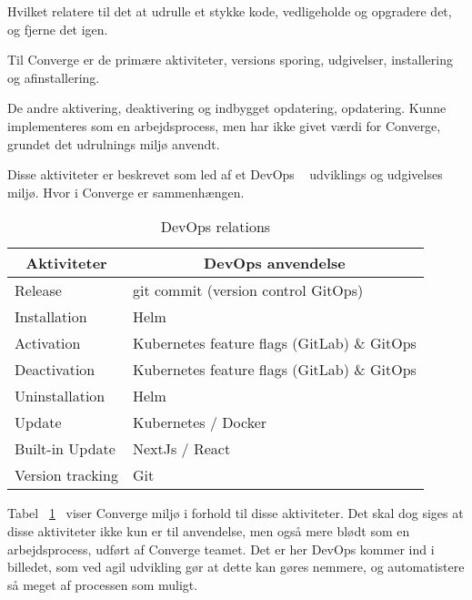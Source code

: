 Hvilket relatere til det at udrulle et stykke kode, vedligeholde og opgradere det, og fjerne det igen.

Til Converge er de primære aktiviteter, versions sporing, udgivelser, installering og afinstallering.

De andre aktivering, deaktivering og indbygget opdatering, opdatering. Kunne implementeres som en arbejdsprocess, men har ikke givet værdi for Converge, grundet det udrulnings miljø anvendt.

Disse aktiviteter er beskrevet som led af et DevOps ~\cite{documentation_terms} udviklings og udgivelses miljø. Hvor i Converge er sammenhængen.

\begin{table}[H]
    \begin{small}
        \caption{DevOps relations}
        \label{tab:devops-relation}
        \begin{center}
            \begin{tabular}[c]{l|l}
                \multicolumn{1}{c|}{\textbf{Aktiviteter}} & 
                \multicolumn{1}{c}{\textbf{DevOps anvendelse}} \\
                \hline
                Release & git commit (version control GitOps) \\
                Installation & Helm \\
                Activation & Kubernetes feature flags  (GitLab) \& GitOps \\
                Deactivation & Kubernetes feature flags (GitLab) \& GitOps \\
                Uninstallation & Helm\\
                Update & Kubernetes / Docker ~\cite{documentation_terms}\\
                Built-in Update & NextJs / React \\
                Version tracking & Git \\
            \end{tabular}
        \end{center}
    \end{small}
\end{table}

Tabel ~\ref{tab:devops-relation}~\cite{documentation_terms} viser Converge miljø i forhold til disse aktiviteter. Det skal dog siges at disse aktiviteter ikke kun er til anvendelse, men også mere blødt som en arbejdsprocess, udført af Converge teamet. Det er her DevOps kommer ind i billedet, som ved agil udvikling gør at dette kan gøres nemmere, og automatistere så meget af processen som muligt.

